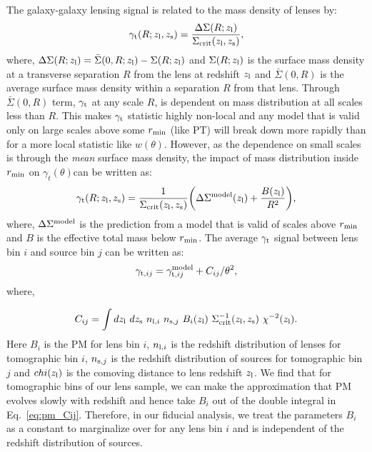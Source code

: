 \documentclass[fleqn,usenatbib]{mnras}
\newcommand{\gammat}{\ensuremath{\gamma_{t}(\theta)}}
\newcommand{\wtheta}{\ensuremath{w(\theta)}}
\begin{document}
        
    The galaxy-galaxy lensing signal is related to the mass density of lenses by:
    \begin{equation}
        \gamma_{\rm t}(R;z_{\rm l},z_{\rm s}) = \frac{\Delta \Sigma (R;z_{\rm l})}{\Sigma_{\rm crit} (z_{\rm l},z_{\rm s})},
    \end{equation}
    where, $\Delta \Sigma(R;z_{\rm l}) = \bar{\Sigma}(0,R; z_{\rm l}) - \Sigma(R;z_{\rm l})$ and $\Sigma(R;z_{\rm l})$ is the surface mass density at a transverse separation $R$ from the lens at redshift $z_{\rm l}$ and $\bar{\Sigma}(0,R)$ is the average surface mass density within a separation $R$ from that lens. Through $\bar{\Sigma}(0,R)$ term, $\gamma_{\rm t}$  at any scale $R$, is dependent on mass distribution at all scales less than $R$. This makes $\gamma_{\rm t}$ statistic highly non-local and any model that is valid only on large scales above some $r_{\rm min}$ (like PT) will break down more rapidly than for a more local statistic like \wtheta. However, as the dependence on small scales is through the \textit{mean} surface mass density, the impact of mass distribution inside $r_{\rm min}$ on \gammat can be written as:
    \begin{equation}
        \gamma_{\rm t}(R;z_{\rm l},z_{\rm s}) = \frac{1}{\Sigma_{\rm crit}(z_{\rm l},z_{\rm s})} \bigg(\Delta \Sigma^{\rm model}(z_{\rm l}) + \frac{B(z_{\rm l})}{R^2} \bigg),
    \end{equation}
    where, $\Delta \Sigma^{\rm model}$ is the prediction from a model that is valid of scales above $r_{\rm min}$ and $B$ is the effective total mass below $r_{\rm min}$.  The average $\gamma_{\rm t}$ signal between lens bin $i$ and source bin $j$ can be written as:
    \begin{equation}
        \gamma_{{\rm t},ij} = \gamma^{\rm model}_{{\rm t},ij} + C_{ij}/\theta^2,
    \end{equation}
    where,
    
    \begin{equation}\label{eq:pm_Cij}
        C_{ij} = \int dz_{\rm l} \ dz_{\rm s} \ n_{{\rm l},i} \ n_{{\rm s},j} \ B_i(z_{\rm l}) \ \Sigma^{-1}_{\rm crit}(z_{\rm l},z_{\rm s}) \ \chi^{-2}(z_{\rm l}).
    \end{equation}
    Here $B_i$ is the PM for lens bin $i$, $n_{{\rm l},i}$ is the redshift distribution of lenses for tomographic bin $i$, $n_{{\rm s},j}$ is the redshift distribution of sources for tomographic bin $j$ and $chi(z_{\rm l})$ is the comoving distance to lens redshift $z_{\rm l}$. We find that for tomographic bins of our lens sample, we can make the approximation that PM evolves slowly with redshift and hence take $B_i$ out of the double integral in Eq.~\ref{eq:pm_Cij}. Therefore, in our fiducial analysis, we treat the parameters $B_i$ as a constant to marginalize over for any lens bin $i$ and is independent of the redshift distribution of sources. 
    
\end{document}

